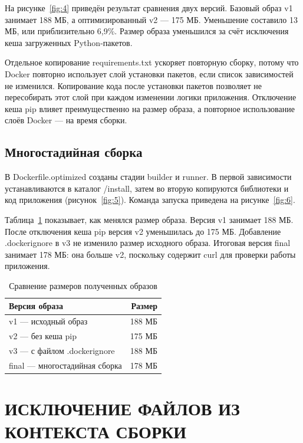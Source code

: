 \documentclass[14pt,a4paper]{extarticle}
\begin{document}
На рисунке~\ref{fig:4} приведён результат сравнения двух версий. Базовый образ v1 занимает 188 МБ, а оптимизированный v2 — 175 МБ. Уменьшение составило 13 МБ, или приблизительно 6,9\%. Размер образа уменьшился за счёт исключения кеша загруженных Python-пакетов.

Отдельное копирование requirements.txt ускоряет повторную сборку, потому что Docker повторно использует слой установки пакетов, если список зависимостей не изменился. Копирование кода после установки пакетов позволяет не пересобирать этот слой при каждом изменении логики приложения. Отключение кеша pip влияет преимущественно на размер образа, а повторное использование слоёв Docker — на время сборки.

\subsection{Многостадийная сборка}

В Dockerfile.optimized созданы стадии builder и runner. В первой зависимости устанавливаются в каталог /install, затем во вторую копируются библиотеки и код приложения (рисунок~\ref{fig:5}). Команда запуска приведена на рисунке~\ref{fig:6}.

Таблица~\ref{tab:sizes} показывает, как менялся размер образа. Версия v1 занимает 188 МБ. После отключения кеша pip версия v2 уменьшилась до 175 МБ. Добавление .dockerignore в v3 не изменило размер исходного образа. Итоговая версия final занимает 178 МБ: она больше v2, поскольку содержит curl для проверки работы приложения.
\begin{table}[H]
\caption{Сравнение размеров полученных образов}\label{tab:sizes}
\centering
\small{}
\begin{tabular}{|p{.66\linewidth}|r|}\hline
Версия образа & Размер\\\hline
v1 — исходный образ & 188 МБ\\\hline
v2 — без кеша pip & 175 МБ\\\hline
v3 — с файлом .dockerignore & 188 МБ\\\hline
final — многостадийная сборка & 178 МБ\\\hline
\end{tabular}
\end{table}

\clearpage
\section{ИСКЛЮЧЕНИЕ ФАЙЛОВ ИЗ КОНТЕКСТА СБОРКИ}
\end{document}

